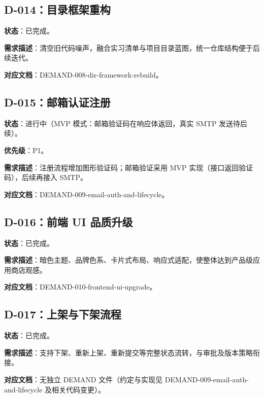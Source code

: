 \documentclass[11pt,a4paper]{article}
\begin{document}
\subsection{D-014：目录框架重构}

\textbf{状态}：已完成。

\textbf{需求描述}：清空旧代码噪声，融合实习清单与项目目录蓝图，统一仓库结构便于后续迭代。

\textbf{对应文档}：DEMAND-008-dir-framework-rebuild。

\subsection{D-015：邮箱认证注册}

\textbf{状态}：进行中（MVP 模式：邮箱验证码在响应体返回，真实 SMTP 发送待后续）。

\textbf{优先级}：\textcolor{warning}{P1}。

\textbf{需求描述}：注册流程增加图形验证码；邮箱验证采用 MVP 实现（接口返回验证码），后续再接入 SMTP。

\textbf{对应文档}：DEMAND-009-email-auth-and-lifecycle。

\subsection{D-016：前端 UI 品质升级}

\textbf{状态}：已完成。

\textbf{需求描述}：暗色主题、品牌色系、卡片式布局、响应式适配，使整体达到产品级应用商店观感。

\textbf{对应文档}：DEMAND-010-frontend-ui-upgrade。

\subsection{D-017：上架与下架流程}

\textbf{状态}：已完成。

\textbf{需求描述}：支持下架、重新上架、重新提交等完整状态流转，与审批及版本策略衔接。

\textbf{对应文档}：无独立 DEMAND 文件（约定与实现见 DEMAND-009-email-auth-and-lifecycle 及相关代码变更）。
\end{document}

